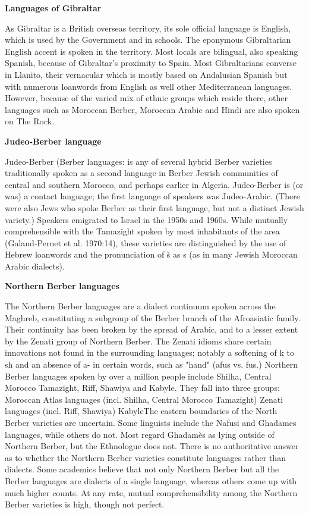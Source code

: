 \documentclass[11pt]{scrartcl} %
\begin{document}
\noindent \textbf{Languages of Gibraltar} \par

As Gibraltar is a British overseas territory, its sole official language is English, which is used by the Government and in schools. The eponymous Gibraltarian English accent is spoken in the territory. Most locals are bilingual, also speaking Spanish, because of Gibraltar's proximity to Spain. Most Gibraltarians converse in Llanito, their vernacular which is mostly based on Andalusian Spanish but with numerous loanwords from English as well other Mediterranean languages. However, because of the varied mix of ethnic groups which reside there, other languages such as Moroccan Berber, Moroccan Arabic and Hindi are also spoken on The Rock.\par

\noindent \textbf{Judeo-Berber language} \par

Judeo-Berber (Berber languages: is any of several hybrid Berber varieties traditionally spoken as a second language in Berber Jewish communities of central and southern Morocco, and perhaps earlier in Algeria. Judeo-Berber is (or was) a contact language; the first language of speakers was Judeo-Arabic. (There were also Jews who spoke Berber as their first language, but not a distinct Jewish variety.) Speakers emigrated to Israel in the 1950s and 1960s. While mutually comprehensible with the Tamazight spoken by most inhabitants of the area (Galand-Pernet et al. 1970:14), these varieties are distinguished by the use of Hebrew loanwords and the pronunciation of š as s (as in many Jewish Moroccan Arabic dialects).\par

\noindent \textbf{Northern Berber languages} \par

The Northern Berber languages are a dialect continuum spoken across the Maghreb, constituting a subgroup of the Berber branch of the Afroasiatic family. Their continuity has been broken by the spread of Arabic, and to a lesser extent by the Zenati group of Northern Berber. The Zenati idioms share certain innovations not found in the surrounding languages; notably a softening of k to sh and an absence of a- in certain words, such as "hand" (afus vs. fus.) Northern Berber languages spoken by over a million people include Shilha, Central Morocco Tamazight, Riff, Shawiya and Kabyle. They fall into three groups: Moroccan Atlas languages (incl. Shilha, Central Morocco Tamazight) Zenati languages (incl. Riff, Shawiya) KabyleThe eastern boundaries of the North Berber varieties are uncertain. Some linguists include the Nafusi and Ghadames languages, while others do not. Most regard Ghadamès as lying outside of Northern Berber, but the Ethnologue does not. There is no authoritative answer as to whether the Northern Berber varieties constitute languages rather than dialects. Some academics believe that not only Northern Berber but all the Berber languages are dialects of a single language, whereas others come up with much higher counts. At any rate, mutual comprehensibility among the Northern Berber varieties is high, though not perfect.\par
\end{document}
